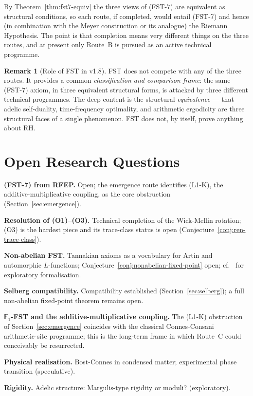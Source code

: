 \documentclass[11pt,a4paper]{article}
\theoremstyle{plain}
\theoremstyle{definition}
\newtheorem{remark}[theorem]{Remark}
\newcommand{\F}{\mathbb{F}}
\begin{document}
By Theorem~\ref{thm:fst7-equiv} the three views of (FST-7) are
equivalent as structural conditions, so each route, if completed,
would entail (FST-7) and hence (in combination with the Meyer
construction or its analogue) the Riemann Hypothesis.  The point is
that completion means very different things on the three routes, and
at present only Route~B is pursued as an active technical programme.

\begin{remark}[Role of FST in v1.8]\label{rem:fst-role-v07}
FST does not compete with any of the three routes.  It provides a
common \emph{classification and comparison frame}: the same
(FST-7) axiom, in three equivalent structural forms, is attacked by
three different technical programmes.  The deep content is the
structural \emph{equivalence} --- that adelic self-duality,
time-frequency optimality, and arithmetic ergodicity are three
structural faces of a single phenomenon.  FST does not, by itself,
prove anything about RH.
\end{remark}

\section{Open Research Questions}
\label{sec:ofq}

\begin{description}[style=nextline,leftmargin=*,labelwidth=3.5em]
\item[(OFQ1)] \textbf{(FST-7) from RFEP.} Open; the emergence route
  identifies (L1-K), the additive-multiplicative coupling, as the
  core obstruction (Section~\ref{sec:emergence}).
\item[(OFQ2)] \textbf{Resolution of (O1)--(O3).}  Technical
  completion of the Wick-Mellin rotation; (O3) is the hardest piece
  and its trace-class status is open
  (Conjecture~\ref{conj:ren-trace-class}).
\item[(OFQ3)] \textbf{Non-abelian FST.}  Tannakian axioms as a
  vocabulary for Artin and automorphic $L$-functions;
  Conjecture~\ref{conj:nonabelian-fixed-point} open;
  cf.\ \cite{TannakianAxioms} for exploratory formalisation.
\item[(OFQ4)] \textbf{Selberg compatibility.} Compatibility
  established (Section~\ref{sec:selberg}); a full non-abelian
  fixed-point theorem remains open.
\item[(OFQ5)] \textbf{$\F_1$-FST and the additive-multiplicative
  coupling.}  The (L1-K) obstruction of
  Section~\ref{sec:emergence} coincides with the classical
  Connes-Consani arithmetic-site programme; this is the long-term
  frame in which Route~C could conceivably be resurrected.
\item[(OFQ6)] \textbf{Physical realisation.}  Bost-Connes in
  condensed matter; experimental phase transition (speculative).
\item[(OFQ7)] \textbf{Rigidity.}  Adelic structure: Margulis-type
  rigidity or moduli?  (exploratory).
\end{description}
\end{document}
